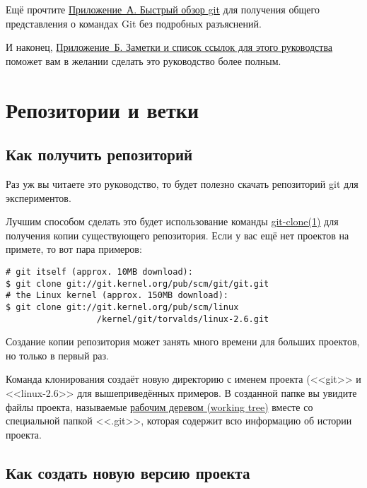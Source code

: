 \documentclass[a4paper, 12pt]{report}
\begin{document}
Ещё прочтите \href{#appendixa}{Приложение~А. Быстрый обзор git} для получения
общего представления о командах Git без подробных разъяснений.

И наконец, \href{#appendixb}{Приложение~Б. Заметки и список ссылок для этого
руководства} поможет вам в желании сделать это руководство более
полным.
%
%
\chapter{Репозитории и ветки}
\hypertarget{#chapter1}{}

\section{Как получить репозиторий}

Раз уж вы читаете это руководство, то будет полезно скачать репозиторий git для 
экспериментов.

Лучшим способом сделать это будет использование команды
\href{http://www.kernel.org/pub/software/scm/git/docs/git-clone.html}{git-clone(1)}
для получения копии существующего репозитория. Если у вас ещё нет проектов на 
примете, то вот пара примеров:

\begin{lstlisting}
# git itself (approx. 10MB download):
$ git clone git://git.kernel.org/pub/scm/git/git.git
# the Linux kernel (approx. 150MB download):
$ git clone git://git.kernel.org/pub/scm/linux
                  /kernel/git/torvalds/linux-2.6.git
\end{lstlisting}

Создание копии репозитория может занять много времени для больших проектов, но 
только в первый раз.

Команда клонирования создаёт новую директорию с именем проекта (<<git>> и <<linux-2.6>>
для вышеприведённых примеров. В созданной папке вы увидите файлы проекта, называемые
\href{#def_working_tree}{рабочим деревом (working tree)} вместе со специальной папкой 
<<.git>>, которая содержит всю информацию об истории проекта.



\section{Как создать новую версию проекта}
\end{document}
